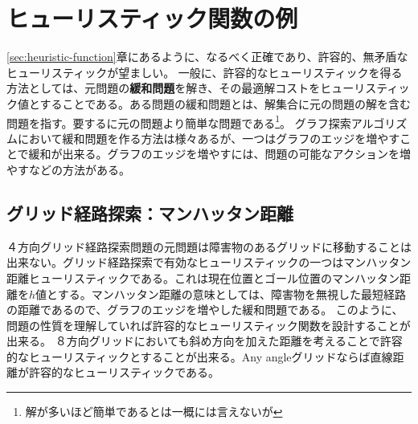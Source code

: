 % 

\section{ヒューリスティック関数の例}
\label{sec:heuristic-example}

\ref{sec:heuristic-function}章にあるように、なるべく正確であり、許容的、無矛盾なヒューリスティックが望ましい。
一般に、許容的なヒューリスティックを得る方法としては、元問題の{\bf 緩和問題}を解き、その最適解コストをヒューリスティック値とすることである。ある問題の緩和問題とは、解集合に元の問題の解を含む問題を指す。要するに元の問題より簡単な問題である\footnote{解が多いほど簡単であるとは一概には言えないが}。
グラフ探索アルゴリズムにおいて緩和問題を作る方法は様々あるが、一つはグラフのエッジを増やすことで緩和が出来る。グラフのエッジを増やすには、問題の可能なアクションを増やすなどの方法がある。

\subsection{グリッド経路探索：マンハッタン距離}

４方向グリッド経路探索問題の元問題は障害物のあるグリッドに移動することは出来ない。グリッド経路探索で有効なヒューリスティックの一つはマンハッタン距離ヒューリスティックである。これは現在位置とゴール位置のマンハッタン距離を$h$値とする。マンハッタン距離の意味としては、障害物を無視した最短経路の距離であるので、グラフのエッジを増やした緩和問題である。
このように、問題の性質を理解していれば許容的なヒューリスティック関数を設計することが出来る。
８方向グリッドにおいても斜め方向を加えた距離を考えることで許容的なヒューリスティックとすることが出来る。Any angleグリッドならば直線距離が許容的なヒューリスティックである。


